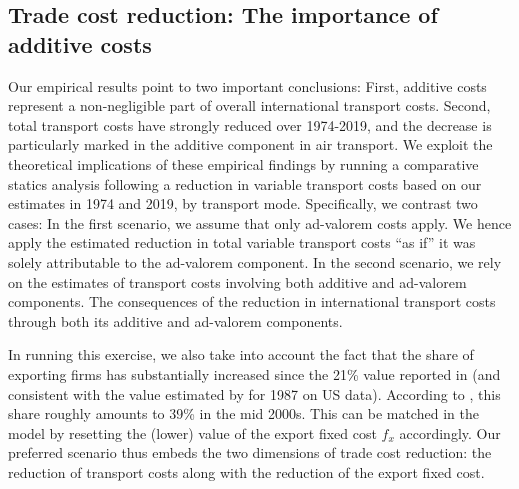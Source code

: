 \documentclass[a4paper,11pt]{article}
\begin{document}
\subsection{Trade cost reduction: The importance of additive costs}

Our empirical results point to two important conclusions: First, additive costs represent a non-negligible part of overall international transport costs. Second, total transport costs have strongly reduced over 1974-2019, and the decrease is particularly marked in the additive component in air transport. We exploit the theoretical implications of these empirical findings by running a comparative statics analysis following a reduction in variable transport costs based on our estimates in 1974 and 2019, by transport mode. Specifically, we contrast two cases: In the first scenario, we assume that only ad-valorem costs apply. We hence apply the estimated reduction in total variable transport costs ``as if'' it was solely attributable to the ad-valorem component. In the second scenario, we rely on the estimates of transport costs involving both additive and ad-valorem components. The consequences of the reduction in international transport costs through both its additive and ad-valorem components.

In running this exercise, we also take into account the fact that the share of exporting firms has substantially increased since the 21\% value reported in \cite{BEJK-AER-03} (and consistent with the value estimated by \citet{Lincoln_McCallum2018} for 1987 on US data). According to \cite{Lincoln_McCallum2018}, this share roughly amounts to 39\% in the mid 2000s. This can be matched in the model by resetting the (lower) value of the export fixed cost $f_x$ accordingly. Our preferred scenario thus embeds the two dimensions of trade cost reduction: the reduction of transport costs along with the reduction of the export fixed cost.
\end{document}
